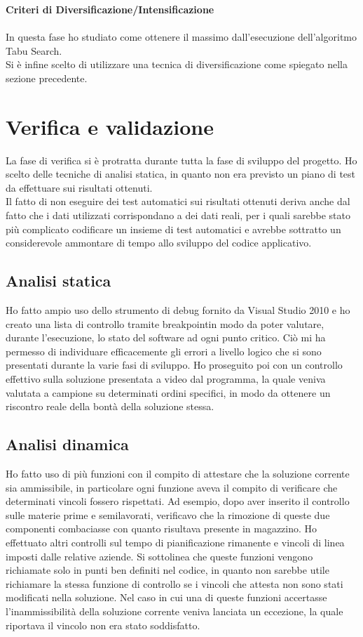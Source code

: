 \textbf{Criteri di Diversificazione/Intensificazione}\\ \\
In questa fase ho studiato come ottenere il massimo dall'esecuzione dell'algoritmo Tabu Search.\\
Si è infine scelto di utilizzare una tecnica di diversificazione come spiegato nella sezione precedente.

\newpage

\section{Verifica e validazione}

La fase di verifica si è protratta durante tutta la fase di sviluppo del progetto. Ho scelto delle tecniche di analisi statica, in quanto non era previsto un piano di test
da effettuare sui risultati ottenuti.\\ Il fatto di non eseguire dei test automatici sui risultati ottenuti deriva anche dal fatto che i dati utilizzati corrispondano
a dei dati reali, per i quali sarebbe stato più complicato codificare un insieme di test automatici e avrebbe sottratto un considerevole ammontare di tempo allo sviluppo del
codice applicativo. 

\subsection{Analisi statica}

Ho fatto ampio uso dello strumento di debug fornito da Visual Studio 2010 e ho creato una lista di controllo tramite breakpoint\glosp in modo da poter
valutare, durante l'esecuzione, lo stato del software ad ogni punto critico. Ciò mi ha permesso di individuare efficacemente gli errori a livello logico che si sono presentati
durante la varie fasi di sviluppo. Ho proseguito poi con un controllo effettivo sulla soluzione presentata a video dal programma, la quale veniva valutata a campione su determinati 
ordini specifici, in modo da ottenere un riscontro reale della bontà della soluzione stessa. 

\subsection{Analisi dinamica}

Ho fatto uso di più funzioni con il compito di attestare che la soluzione corrente sia ammissibile, in particolare ogni funzione aveva il compito di verificare che
determinati vincoli fossero rispettati. Ad esempio, dopo aver inserito il controllo sulle materie prime e semilavorati, verificavo che la rimozione di queste due componenti
combaciasse con quanto risultava presente in magazzino. Ho effettuato altri controlli sul tempo di pianificazione rimanente e vincoli di linea imposti dalle relative
aziende. Si sottolinea che queste funzioni vengono richiamate solo in punti ben definiti nel codice, in quanto non sarebbe utile richiamare la stessa funzione di controllo
se i vincoli che attesta non sono stati modificati nella soluzione. Nel caso in cui una di queste funzioni accertasse l'inammissibilità della soluzione corrente veniva 
lanciata un eccezione, la quale riportava il vincolo non era stato soddisfatto.


